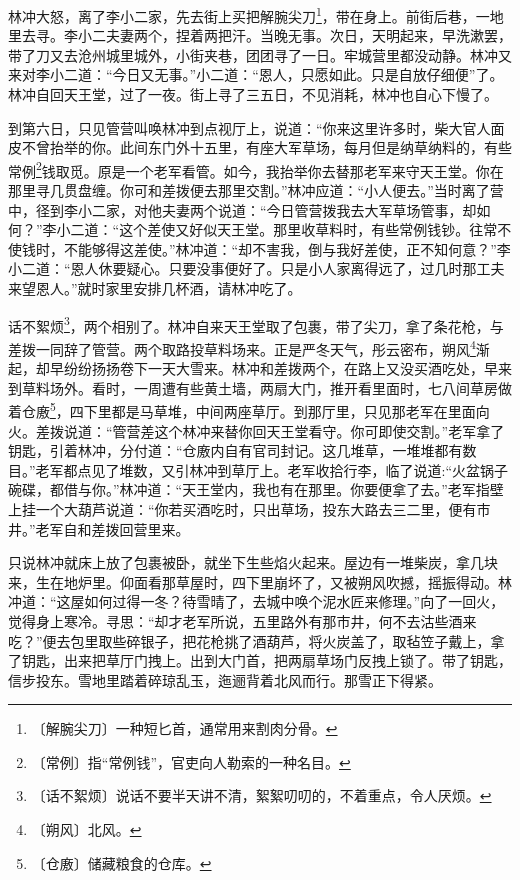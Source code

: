\documentclass[12pt,UTF-8,openany]{ctexbook}
\begin{document}
\begin{normalsize}
    林冲大怒，离了李小二家，先去街上买把解腕尖刀\footnote{〔解腕尖刀〕一种短匕首，通常用来割肉分骨。}，带在身上。前街后巷，一地里去寻。李小二夫妻两个，捏着两把汗。当晚无事。次日，天明起来，早洗漱罢，带了刀又去沧州城里城外，小街夹巷，团团寻了一日。牢城营里都没动静。林冲又来对李小二道：“今日又无事。”小二道：“恩人，只愿如此。只是自放仔细便”了。林冲自回天王堂，过了一夜。街上寻了三五日，不见消耗，林冲也自心下慢了。
    
    到第六日，只见管营叫唤林冲到点视厅上，说道：“你来这里许多时，柴大官人面皮不曾抬举的你。此间东门外十五里，有座大军草场，每月但是纳草纳料的，有些常例\footnote{〔常例〕指“常例钱”，官吏向人勒索的一种名目。}钱取觅。原是一个老军看管。如今，我抬举你去替那老军来守天王堂。你在那里寻几贯盘缠。你可和差拨便去那里交割。”林冲应道：“小人便去。”当时离了营中，径到李小二家，对他夫妻两个说道：“今日管营拨我去大军草场管事，却如何？”李小二道：“这个差使又好似天王堂。那里收草料时，有些常例钱钞。往常不使钱时，不能够得这差使。”林冲道：“却不害我，倒与我好差使，正不知何意？”李小二道：“恩人休要疑心。只要没事便好了。只是小人家离得远了，过几时那工夫来望恩人。”就时家里安排几杯酒，请林冲吃了。
    
    话不絮烦\footnote{〔话不絮烦〕说话不要半天讲不清，絮絮叨叨的，不着重点，令人厌烦。}，两个相别了。林冲自来天王堂取了包裹，带了尖刀，拿了条花枪，与差拨一同辞了管营。两个取路投草料场来。正是严冬天气，彤云密布，朔风\footnote{〔朔风〕北风。}渐起，却早纷纷扬扬卷下一天大雪来。林冲和差拨两个，在路上又没买酒吃处，早来到草料场外。看时，一周遭有些黄土墙，两扇大门，推开看里面时，七八间草房做着仓廒\footnote{〔仓廒〕储藏粮食的仓库。}，四下里都是马草堆，中间两座草厅。到那厅里，只见那老军在里面向火。差拨说道：“管营差这个林冲来替你回天王堂看守。你可即使交割。”老军拿了钥匙，引着林冲，分付道：“仓廒内自有官司封记。这几堆草，一堆堆都有数目。”老军都点见了堆数，又引林冲到草厅上。老军收拾行李，临了说道:“火盆锅子碗碟，都借与你。”林冲道：“天王堂内，我也有在那里。你要便拿了去。”老军指壁上挂一个大葫芦说道：“你若买酒吃时，只出草场，投东大路去三二里，便有市井。”老军自和差拨回营里来。
    
    只说林冲就床上放了包裹被卧，就坐下生些焰火起来。屋边有一堆柴炭，拿几块来，生在地炉里。仰面看那草屋时，四下里崩坏了，又被朔风吹撼，摇振得动。林冲道：“这屋如何过得一冬？待雪晴了，去城中唤个泥水匠来修理。”向了一回火，觉得身上寒冷。寻思：“却才老军所说，五里路外有那市井，何不去沽些酒来吃？”便去包里取些碎银子，把花枪挑了酒葫芦，将火炭盖了，取毡笠子戴上，拿了钥匙，出来把草厅门拽上。出到大门首，把两扇草场门反拽上锁了。带了钥匙，信步投东。雪地里踏着碎琼乱玉，迤逦背着北风而行。那雪正下得紧。
    

\end{normalsize}
\end{document}
